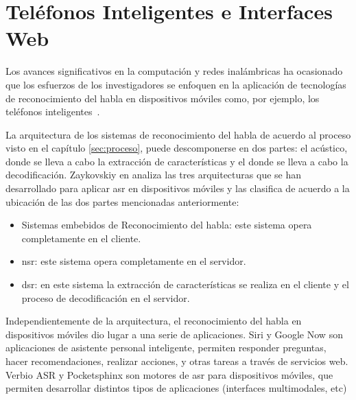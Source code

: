 \section{Tel\'efonos Inteligentes e Interfaces Web}
\label{sec:smartphones}

Los avances significativos en la computaci\'on y redes inal\'ambricas ha ocasionado
que los esfuerzos de los investigadores se enfoquen en la aplicaci\'on de tecnolog\'ias de
reconocimiento del habla en dispositivos m\'oviles como, por ejemplo, los tel\'efonos 
\mbox{inteligentes \cite{TanAutomatic2008}}.

La arquitectura de los sistemas de reconocimiento del habla de acuerdo al proceso visto en el cap\'itulo \ref{sec:proceso},
puede descomponerse en dos partes: el  ac\'ustico, donde se lleva a cabo
la extracci\'on de caracter\'isticas  y el  donde se lleva a cabo la decodificaci\'on. 
Zaykovskiy en \cite{ZaykovskiySurvey2006} analiza las tres arquitecturas que se han desarrollado
para aplicar \gls{asr} en dispositivos m\'oviles y las clasifica de acuerdo a la ubicaci\'on de las dos partes
mencionadas anteriormente:

\begin{itemize}
    \item Sistemas embebidos de Reconocimiento del habla: este sistema opera completamente en el cliente.
    \item \gls{nsr}: este sistema opera completamente en el servidor. 
    \item \gls{dsr}: en este sistema la extracci\'on de caracter\'isticas se realiza
        en el cliente y el proceso de decodificaci\'on en el servidor.
\end{itemize}

Independientemente de la arquitectura, el reconocimiento del habla en dispositivos m\'oviles dio lugar a una 
serie de aplicaciones. Siri \cite{AppleSiri, OneAccordSiri} y Google Now \cite{GoogleNow} 
son aplicaciones de asistente personal inteligente, permiten responder preguntas,
hacer recomendaciones, realizar acciones, y otras tareas a trav\'es de servicios web. Verbio ASR \cite{VerbioASR} y 
Pocketsphinx \cite{HugginsDainesPocketSphinx2006, PocketSphinxHomePage} son motores de \gls{asr} para dispositivos
m\'oviles, que permiten desarrollar distintos tipos de aplicaciones (interfaces multimodales, etc)

